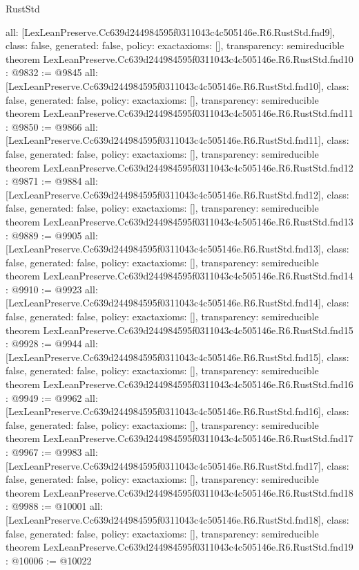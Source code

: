 \begin{lexlean}{RustStd}
\begin{coremodule}
{  all: [LexLeanPreserve.Cc639d244984595f0311043c4c505146e.R6.RustStd.fnd9],
  class: false,
  generated: false,
  policy: exact{axioms: []},
  transparency: semireducible
}
theorem LexLeanPreserve.Cc639d244984595f0311043c4c505146e.R6.RustStd.fnd10 : @9832 := @9845 {
  all: [LexLeanPreserve.Cc639d244984595f0311043c4c505146e.R6.RustStd.fnd10],
  class: false,
  generated: false,
  policy: exact{axioms: []},
  transparency: semireducible
}
theorem LexLeanPreserve.Cc639d244984595f0311043c4c505146e.R6.RustStd.fnd11 : @9850 := @9866 {
  all: [LexLeanPreserve.Cc639d244984595f0311043c4c505146e.R6.RustStd.fnd11],
  class: false,
  generated: false,
  policy: exact{axioms: []},
  transparency: semireducible
}
theorem LexLeanPreserve.Cc639d244984595f0311043c4c505146e.R6.RustStd.fnd12 : @9871 := @9884 {
  all: [LexLeanPreserve.Cc639d244984595f0311043c4c505146e.R6.RustStd.fnd12],
  class: false,
  generated: false,
  policy: exact{axioms: []},
  transparency: semireducible
}
theorem LexLeanPreserve.Cc639d244984595f0311043c4c505146e.R6.RustStd.fnd13 : @9889 := @9905 {
  all: [LexLeanPreserve.Cc639d244984595f0311043c4c505146e.R6.RustStd.fnd13],
  class: false,
  generated: false,
  policy: exact{axioms: []},
  transparency: semireducible
}
theorem LexLeanPreserve.Cc639d244984595f0311043c4c505146e.R6.RustStd.fnd14 : @9910 := @9923 {
  all: [LexLeanPreserve.Cc639d244984595f0311043c4c505146e.R6.RustStd.fnd14],
  class: false,
  generated: false,
  policy: exact{axioms: []},
  transparency: semireducible
}
theorem LexLeanPreserve.Cc639d244984595f0311043c4c505146e.R6.RustStd.fnd15 : @9928 := @9944 {
  all: [LexLeanPreserve.Cc639d244984595f0311043c4c505146e.R6.RustStd.fnd15],
  class: false,
  generated: false,
  policy: exact{axioms: []},
  transparency: semireducible
}
theorem LexLeanPreserve.Cc639d244984595f0311043c4c505146e.R6.RustStd.fnd16 : @9949 := @9962 {
  all: [LexLeanPreserve.Cc639d244984595f0311043c4c505146e.R6.RustStd.fnd16],
  class: false,
  generated: false,
  policy: exact{axioms: []},
  transparency: semireducible
}
theorem LexLeanPreserve.Cc639d244984595f0311043c4c505146e.R6.RustStd.fnd17 : @9967 := @9983 {
  all: [LexLeanPreserve.Cc639d244984595f0311043c4c505146e.R6.RustStd.fnd17],
  class: false,
  generated: false,
  policy: exact{axioms: []},
  transparency: semireducible
}
theorem LexLeanPreserve.Cc639d244984595f0311043c4c505146e.R6.RustStd.fnd18 : @9988 := @10001 {
  all: [LexLeanPreserve.Cc639d244984595f0311043c4c505146e.R6.RustStd.fnd18],
  class: false,
  generated: false,
  policy: exact{axioms: []},
  transparency: semireducible
}
theorem LexLeanPreserve.Cc639d244984595f0311043c4c505146e.R6.RustStd.fnd19 : @10006 := @10022 {
}
\end{coremodule}
\end{lexlean}

